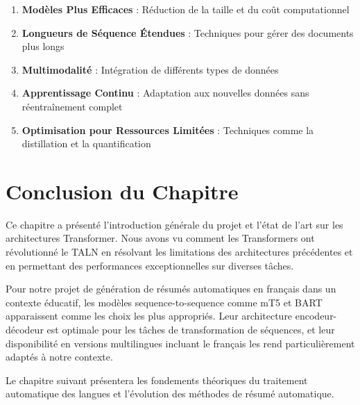 \begin{enumerate}
    \item \textbf{Modèles Plus Efficaces} : Réduction de la taille et du coût computationnel
    \item \textbf{Longueurs de Séquence Étendues} : Techniques pour gérer des documents plus longs
    \item \textbf{Multimodalité} : Intégration de différents types de données
    \item \textbf{Apprentissage Continu} : Adaptation aux nouvelles données sans réentraînement complet
    \item \textbf{Optimisation pour Ressources Limitées} : Techniques comme la distillation et la quantification
\end{enumerate}

\section{Conclusion du Chapitre}

Ce chapitre a présenté l'introduction générale du projet et l'état de l'art sur les architectures Transformer. Nous avons vu comment les Transformers ont révolutionné le TALN en résolvant les limitations des architectures précédentes et en permettant des performances exceptionnelles sur diverses tâches.

Pour notre projet de génération de résumés automatiques en français dans un contexte éducatif, les modèles sequence-to-sequence comme mT5 et BART apparaissent comme les choix les plus appropriés. Leur architecture encodeur-décodeur est optimale pour les tâches de transformation de séquences, et leur disponibilité en versions multilingues incluant le français les rend particulièrement adaptés à notre contexte.

Le chapitre suivant présentera les fondements théoriques du traitement automatique des langues et l'évolution des méthodes de résumé automatique.

